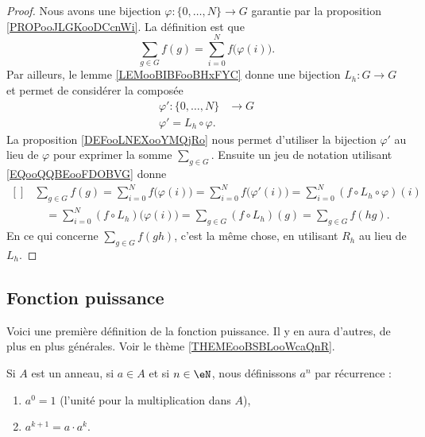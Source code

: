 \begin{proof}
    Nous avons une bijection \( \varphi\colon \{ 0,\ldots,  N \}\to G\) garantie par la proposition \ref{PROPooJLGKooDCcnWi}. La définition est que
    \begin{equation}
        \sum_{g\in G}f(g)=\sum_{i=0}^Nf\big( \varphi(i) \big).
    \end{equation}
    Par ailleurs, le lemme \ref{LEMooBIBFooBHxFYC} donne une bijection \( L_h\colon G\to G\) et permet de considérer la composée
    \begin{equation}
        \begin{aligned}
            \varphi'\colon \{ 0,\ldots,  N \}&\to G \\
            \varphi'=L_h\circ \varphi.
        \end{aligned}
    \end{equation}
    La proposition \ref{DEFooLNEXooYMQjRo} nous permet d'utiliser la bijection \( \varphi'\) au lieu de \( \varphi\) pour exprimer la somme \( \sum_{g\in G}\). Ensuite un jeu de notation utilisant \eqref{EQooQQBEooFDOBVG} donne
    \begin{equation}
        \begin{aligned}[]
            &\sum_{g\in G}f(g)=\sum_{i=0}^Nf\big( \varphi(i) \big)=\sum_{i=0}^Nf\big( \varphi'(i) \big)=\sum_{i=0}^N(f\circ L_h\circ \varphi)(i)\\
            &\quad=\sum_{i=0}^N(f\circ L_h)\big( \varphi(i) \big)=\sum_{g\in G}(f\circ L_h)(g)=\sum_{g\in G}f(hg).
        \end{aligned}
    \end{equation}
    En ce qui concerne \( \sum_{g\in G}f(gh)\), c'est la même chose, en utilisant \( R_h\) au lieu de \( L_h\).
\end{proof}

\subsection{Fonction puissance}

Voici une première définition de la fonction puissance. Il y en aura d'autres, de plus en plus générales. Voir le thème \ref{THEMEooBSBLooWcaQnR}.
\begin{definition}\label{DEFooGVSFooFVLtNo}
    Si \( A\) est un anneau, si \( a\in A\) et si \( n\in \eN\), nous définissons \( a^n\) par récurrence :
    \begin{enumerate}
        \item
            \( a^0=1\) (l'unité pour la multiplication dans \( A\)),
        \item       \label{ITEMooOUIPooGjAgQb}
            \( a^{k+1}=a\cdot a^{k}\).
    \end{enumerate}
\end{definition}

